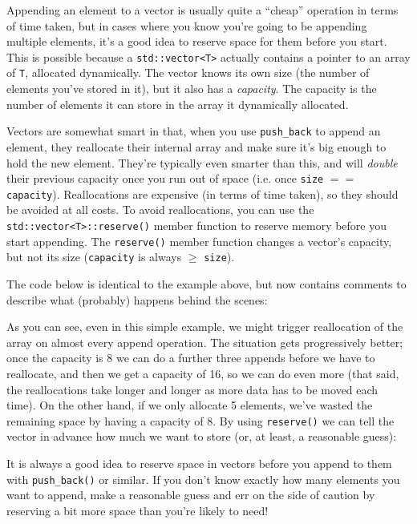 \documentclass[a4paper]{scrartcl}
\begin{document}


Appending an element to a vector is usually quite a ``cheap'' operation in terms of time taken, but in cases where you know you're going to be appending multiple elements, it's a good idea to reserve space for them before you start. This is possible because a \verb|std::vector<T>| actually contains a pointer to an array of \verb|T|, allocated dynamically. The vector knows its own size (the number of elements you've stored in it), but it also has a \emph{capacity}. The capacity is the number of elements it can store in the array it dynamically allocated.

Vectors are somewhat smart in that, when you use \verb|push_back| to append an element, they reallocate their internal array and make sure it's big enough to hold the new element. They're typically even smarter than this, and will \emph{double} their previous capacity once you run out of space (i.e. once \verb|size| $==$ \verb|capacity|). Reallocations are expensive (in terms of time taken), so they should be avoided at all costs. To avoid reallocations, you can use the \verb|std::vector<T>::reserve()| member function to reserve memory before you start appending. The \verb|reserve()| member function changes a vector's capacity, but not its size (\verb|capacity| is always $\ge$ \verb|size|).

The code below is identical to the example above, but now contains comments to describe what (probably) happens behind the scenes:



As you can see, even in this simple example, we might trigger reallocation of the array on almost every append operation. The situation gets progressively better; once the capacity is 8 we can do a further three appends before we have to reallocate, and then we get a capacity of 16, so we can do even more (that said, the reallocations take longer and longer as more data has to be moved each time). On the other hand, if we only allocate 5 elements, we've wasted the remaining space by having a capacity of 8. By using \verb|reserve()| we can tell the vector in advance how much we want to store (or, at least, a reasonable guess):



It is always a good idea to reserve space in vectors before you append to them with \verb|push_back()| or similar. If you don't know exactly how many elements you want to append, make a reasonable guess and err on the side of caution by reserving a bit more space than you're likely to need!
\end{document}
